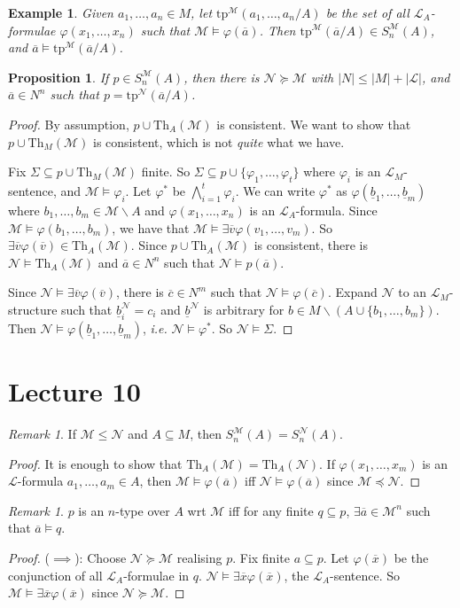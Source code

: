 \documentclass[]{article}
\theoremstyle{custhm}
\theoremstyle{cusdef}
\theoremstyle{custhm}
\theoremstyle{custhm}
\theoremstyle{custhm}
\newtheorem{prop}[theorem]{Proposition}
\theoremstyle{ex}
\newtheorem{ex}[theorem]{Example}
\theoremstyle{custhm}
\theoremstyle{cusdef}
\theoremstyle{remark}
\theoremstyle{remark}
\newtheorem{remark}[theorem]{Remark}
\theoremstyle{numremark}
\renewcommand{\L}{\mathcal{L}}
\renewcommand{\it}[1]{\textit{#1}}
\newcommand{\M}{\mathcal{M}}
\renewcommand{\phi}{\varphi}
\renewcommand{\bar}{\overline}
\newcommand{\Th}{\textrm{Th}}
\newcommand{\tp}{\textrm{tp}}
\newcommand{\N}{\mathcal{N}}
\renewcommand{\subset}{\subseteq}
\begin{document}
\begin{ex}
Given $a_1,\dots,a_n\in M$, let $\textrm{tp}^\M(a_1,\dots,a_n/A)$ be the set of all $\L_A$-formulae $\phi(x_1,\dots,x_n)$ such that $\M\models \phi(\bar{a})$. Then $\tp^\M(\bar{a}/A)\in S_n^\M(A)$, and $\bar{a}\models \tp^\M(\bar{a}/A)$.
\end{ex}
\begin{prop}
If $p \in S_n^\M(A)$, then there is $\N\succeq\M$ with $|N| \le |M| + |\L|$, and $\bar{a}\in N^n$ such that $p = \tp^\N(\bar{a}/A)$.
\end{prop}
\begin{proof}
By assumption, $p\cup\Th_A(\M)$ is consistent. We want to show that $p \cup \Th_M(\M)$ is consistent, which is not \it{quite} what we have.

Fix $\Sigma \subset p \cup \Th_M(\M)$ finite. So $\Sigma \subset p \cup \{\phi_1,\dots,\phi_t\}$ where $\phi_i$ is an $\L_M$-sentence, and $\M\models \phi_i$. Let $\phi^\ast$ be $\bigwedge_{i=1}^{t}\phi_i$. We can write $\phi^\ast$ as $\phi(\underline{b}_1,\dots,\underline{b}_m)$ where $b_1,\dots,b_m\in \M\backslash A$ and $\phi(x_1,\dots,x_n)$ is an $\L_A$-formula. Since $\M\models \phi(b_1,\dots,b_m)$, we have that $\M\models \exists \bar{v}\phi(v_1,\dots,v_m)$. So $\exists \bar{v}\phi(\bar{v})\in \Th_A(\M)$. Since $p\cup \Th_A(\M)$ is consistent, there is $\N\models \Th_A(\M)$ and $\bar{a} \in N^n$ such that $\N\models p(\bar{a})$.

Since $\N\models \exists \bar{v}\phi(\bar{v})$, there is $\bar{c} \in N^m$ such that $\N\models \phi(\bar{c})$. Expand $\N$ to an $\L_M$-structure such that $\underline{b}_i^\N = c_i$ and $\underline{b}^\N$ is arbitrary for $b\in M\backslash (A\cup \{b_1,\dots,b_m\})$. Then $\N\models \phi(\underline{b}_1,\dots,\underline{b}_m)$, \it{i.e.} $\N\models \phi^\ast$. So $\N\models \Sigma$.
\end{proof}

\section{Lecture 10}

\begin{remark}
If $\M\le \N$ and $A \subset M$, then $S_n^\M(A) = S_n^\N(A)$.
\end{remark}
\begin{proof}
It is enough to show that $\Th_A(\M) = \Th_A(\N)$. If $\phi(x_1,\dots,x_m)$ is an $\L$-formula $a_1,\dots,a_m\in A$, then $\M\models \phi(\bar{a})$ iff $\N\models \phi(\bar{a})$ since $\M\preceq \N$.
\end{proof}
\begin{remark}
	$p$ is an $n$-type over $A$ wrt $\M$ iff for any finite $q \subset p$, $\exists \bar{a}\in \M^n$ such that $\bar{a}\models q$.
\end{remark}
\begin{proof}
($\implies$): Choose $\N\succeq \M$ realising $p$. Fix finite $a \subset p$. Let $\phi(\bar{x})$ be the conjunction of all $\L_A$-formulae in $q$. $\N\models \exists \bar{x}\phi(\bar{x})$, the $\L_A$-sentence. So $\M\models \exists \bar{x}\phi(\bar{x})$ since $\N\succeq \M$.
\end{proof}
\end{document}
